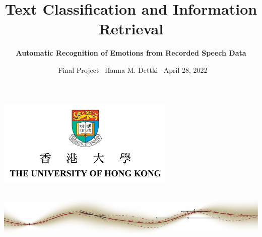 \documentclass[10pt,usepdftitle=false,aspectratio=169]{beamer}
\begin{document}
\tikzexternaldisable
\begin{frame}
  \vspace{2em}
  \title{{\bf \LARGE \textbf{Text Classification and Information Retrieval}}}

  \author{\large \textbf{Automatic Recognition of Emotions from Recorded Speech Data}}
  \date{\large  \textbullet\ Final Project \quad \textbullet \ Hanna M. Dettki	 \quad \textbullet	\ April 28, 2022}
  \maketitle 
  \begin{center}
	\includegraphics[scale=.32]{assets/hku-logo.png} 
  \end{center}



  \thispagestyle{empty}
  \setcounter{framenumber}{0}

  \begin{columns}
  \includegraphics[width=0.9995\paperwidth]{assets/logo_TU_169_0.pdf}
  \end{columns}

\end{frame}
\tikzexternalenable
\end{document}
